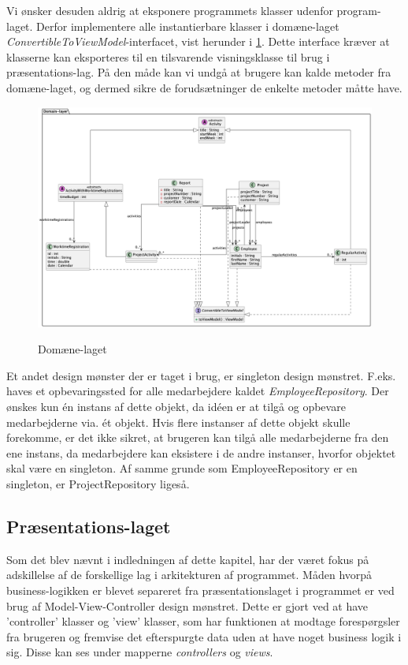 Vi ønsker desuden aldrig at eksponere programmets klasser udenfor program-laget. Derfor implementere alle instantierbare klasser i domæne-laget \textit{ConvertibleToViewModel}-interfacet, vist herunder i \cref{fig:class_persistency_domain}. Dette interface kræver at klasserne kan eksporteres til en tilsvarende visningsklasse til brug i præsentations-lag. På den måde kan vi undgå at brugere kan kalde metoder fra domæne-laget, og dermed sikre de forudsætninger de enkelte metoder måtte have.
\begin{figure}[H]
    \centering
    \caption{Domæne-laget}
    \includegraphics[width = \textwidth]{TaskFusion/out/assets/diagrams/class_persistency_domain/ClassDiagram_domain.png}
    \label{fig:class_persistency_domain}
\end{figure}
Et andet design mønster der er taget i brug, er singleton design mønstret. F.eks. haves et opbevaringssted for alle medarbejdere kaldet \textit{EmployeeRepository}. Der ønskes kun én instans af dette objekt, da idéen er at tilgå og opbevare medarbejderne via. ét objekt. Hvis flere instanser af dette objekt skulle forekomme, er det ikke sikret, at brugeren kan tilgå alle medarbejderne fra den ene instans, da medarbejdere kan eksistere i de andre instanser, hvorfor objektet skal være en singleton. Af samme grunde som EmployeeRepository er en singleton, er ProjectRepository ligeså.
\subsection{Præsentations-laget}
Som det blev nævnt i indledningen af dette kapitel, har der været fokus på adskillelse af de forskellige lag i arkitekturen af programmet. Måden hvorpå business-logikken er blevet separeret fra præsentationslaget i programmet er ved brug af Model-View-Controller design mønstret. Dette er gjort ved at have ’controller’ klasser og ’view’ klasser, som har funktionen at modtage forespørgsler fra brugeren og fremvise det efterspurgte data uden at have noget business logik i sig. Disse kan ses under mapperne \textit{controllers} og \textit{views}.
